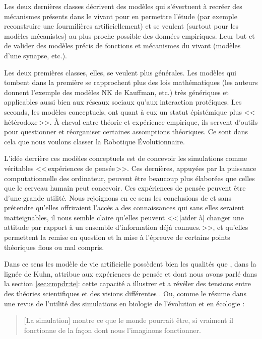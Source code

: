 Les deux dernières classes décrivent des modèles qui s'évertuent à recréer des mécanismes présents dans le vivant pour en permettre l'étude (par exemple reconstruire une fourmilières artificiellement) et se veulent (surtout pour les modèles mécanistes) au plus proche possible des données empiriques. Leur but et de valider des modèles précis de fonctions et mécanismes du vivant (modèles d'une synapse, etc.). 

Les deux premières classes, elles, se veulent plus générales. Les modèles qui tombent dans la première se rapprochent plus des lois mathématiques (les auteurs donnent l'exemple des modèles NK de Kauffman, etc.) très génériques et applicables aussi bien aux réseaux sociaux qu'aux interaction protéiques. Les seconds, les modèles conceptuels, ont quant à eux un statut épistémique plus <<\,hétérodoxe\,>>. À cheval entre théorie et expérience empirique, ils servent d'outils pour questionner et réorganiser certaines assomptions théoriques. Ce sont dans cela que nous voulons classer la Robotique Évolutionnaire.

L'idée derrière ces modèles conceptuels est de concevoir les simulations comme véritables <<\,expériences de pensée\,>>. Ces dernières, appuyées par la puissance computationnelle des   ordinateur, peuvent être beaucoup plus élaborées que celles que le cerveau humain peut concevoir. Ces expériences de pensée peuvent être d'une grande utilité. Nous rejoignons en ce sens les conclusions de \citet{paolo00simulationmodelsasopaquethoughtexperiments} et sans prétendre qu'elles offriraient l'accès a des connaissances qui sans elles seraient inatteignables, il nous semble claire qu'elles peuvent <<\,[aider à] changer une attitude par rapport à un ensemble d'information déjà connues.\,>>, et qu'elles permettent la remise en question et la mise à l'épreuve de certains points théoriques flous ou mal compris.

Dans ce sens les modèle de vie artificielle possèdent bien les qualités que \citet{hacking92dothoughtexperimentshavealifeoftheirown}, dans la lignée de Kuhn, attribue aux expériences de pensée et dont nous avons parlé dans la section \ref{sec:cmpdr:te}: cette capacité a illustrer et a révéler des tensions entre des théories scientifiques et des visions différentes \citep[p. 304]{hacking92dothoughtexperimentshavealifeoftheirown}. Ou, comme le résume \citet{peck04simulationasexperiment} dans une revus de l'utilité des simulations en biologie de l'évolution et en écologie : 
\begin{quote}
	[La simulation] montre ce que le monde pourrait être, si vraiment il fonctionne de la façon dont nous l'imaginons fonctionner. 
	\citep[p. 533]{peck04simulationasexperiment}
\end{quote}

